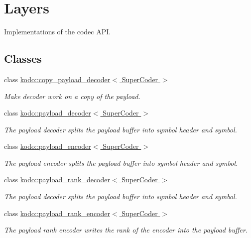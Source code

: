 \hypertarget{group__payload__codec__layers}{\section{Layers}
\label{group__payload__codec__layers}
}


Implementations of the codec A\-P\-I.  


\subsection*{Classes}
\begin{DoxyCompactItemize}
\item 
class \hyperlink{classkodo_1_1copy__payload__decoder}{kodo\-::copy\-\_\-payload\-\_\-decoder$<$ Super\-Coder $>$}
\begin{DoxyCompactList}\small\item\em Make decoder work on a copy of the payload. \end{DoxyCompactList}\item 
class \hyperlink{classkodo_1_1payload__decoder}{kodo\-::payload\-\_\-decoder$<$ Super\-Coder $>$}
\begin{DoxyCompactList}\small\item\em The payload decoder splits the payload buffer into symbol header and symbol. \end{DoxyCompactList}\item 
class \hyperlink{classkodo_1_1payload__encoder}{kodo\-::payload\-\_\-encoder$<$ Super\-Coder $>$}
\begin{DoxyCompactList}\small\item\em The payload encoder splits the payload buffer into symbol header and symbol. \end{DoxyCompactList}\item 
class \hyperlink{classkodo_1_1payload__rank__decoder}{kodo\-::payload\-\_\-rank\-\_\-decoder$<$ Super\-Coder $>$}
\begin{DoxyCompactList}\small\item\em The payload decoder splits the payload buffer into symbol header and symbol. \end{DoxyCompactList}\item 
class \hyperlink{classkodo_1_1payload__rank__encoder}{kodo\-::payload\-\_\-rank\-\_\-encoder$<$ Super\-Coder $>$}
\begin{DoxyCompactList}\small\item\em The payload rank encoder writes the rank of the encoder into the payload buffer. \end{DoxyCompactList}\item 

\end{DoxyCompactItemize}
